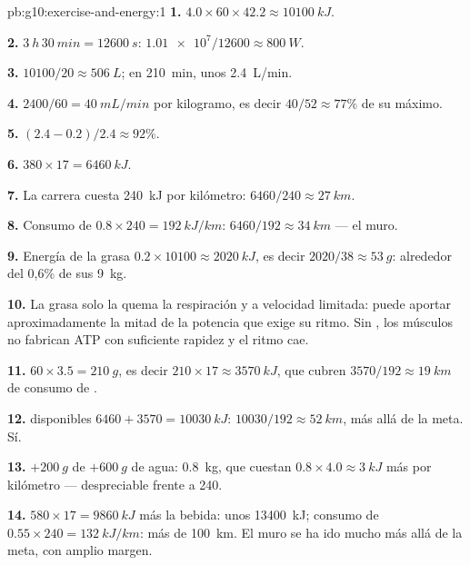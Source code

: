 \begin{solution}{pb:g10:exercise-and-energy:1}
\textbf{1.} $4.0 \times 60 \times 42.2 \approx \qty{10100}{kJ}$.

\textbf{2.} $\qty{3}{h}\,\qty{30}{min} = \qty{12600}{s}$:
$\num{1.01e7}/12600 \approx \qty{800}{W}$.

\textbf{3.} $10100/20 \approx \qty{506}{L}$; en \qty{210}{min}, unos
\qty{2.4}{L/min}.

\textbf{4.} $2400/60 = \qty{40}{mL/min}$ por kilogramo, es decir
$40/52
\approx 77\%$ de su máximo.

\textbf{5.} $(2.4 - 0.2)/2.4 \approx 92\%$.

\textbf{6.} $380 \times 17 = \qty{6460}{kJ}$.

\textbf{7.} La carrera cuesta \qty{240}{kJ} por kilómetro: $6460/240
\approx \qty{27}{km}$.

\textbf{8.} Consumo de  $0.8 \times 240 = \qty{192}{kJ/km}$:
$6460/192 \approx \qty{34}{km}$ --- el muro.

\textbf{9.} Energía de la grasa $0.2 \times 10100 \approx \qty{2020}{kJ}$, es decir $2020/38 \approx \qty{53}{g}$: alrededor del
0,6\% de sus \qty{9}{kg}.

\textbf{10.} La grasa solo la quema la respiración y a velocidad
limitada: puede aportar aproximadamente la mitad de la potencia que
exige su ritmo. Sin , los músculos no fabrican ATP con
suficiente rapidez y el ritmo cae.

\textbf{11.} $60 \times 3.5 = \qty{210}{g}$, es decir $210 \times 17 \approx
\qty{3570}{kJ}$, que cubren $3570/192 \approx \qty{19}{km}$ de
consumo de .

\textbf{12.}  disponibles $6460 + 3570 = \qty{10030}{kJ}$:
$10030/192 \approx \qty{52}{km}$, más allá de la meta. Sí.

\textbf{13.} $+\qty{200}{g}$ de  $+ \qty{600}{g}$ de agua:
\qty{0.8}{kg}, que cuestan $0.8 \times 4.0 \approx \qty{3}{kJ}$ más por
kilómetro --- despreciable frente a 240.

\textbf{14.}  $580 \times 17 = \qty{9860}{kJ}$ más la bebida:
unos \qty{13400}{kJ}; consumo de  $0.55 \times 240 =
\qty{132}{kJ/km}$: más de \qty{100}{km}. El muro se ha ido mucho más
allá de la meta, con amplio margen.


\end{solution}
